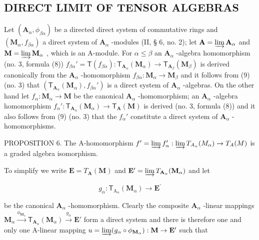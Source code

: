\subsection{DIRECT LIMIT OF TENSOR ALGEBRAS}

Let \((\mathbf{A}_{\alpha},\phi_{\beta \alpha})\) be a directed direct system of commutative rings and \((\mathbf{M}_{\alpha},f_{\beta \alpha})\) a direct system of \(\mathbf{A}_{\alpha}\) -modules (II, § 6, no. 2); let \(\mathbf{A} = \varinjlim \mathbf{A}_{\alpha}\) and \(\mathbf{M} = \varinjlim \mathbf{M}_{\alpha}\) , which is an A-module. For \(\alpha \leqslant \beta\) an \(\mathbf{A}_{\alpha}\) -algebra homomorphism (no. 3, formula (8)) \(f_{\beta \alpha}' = \mathsf{T}(f_{\beta \alpha})\colon \mathsf{T}_{\mathbf{A}_{\alpha}}(\mathbf{M}_{\alpha})\to \mathsf{T}_{\mathbf{A}_{\beta}}(\mathbf{M}_{\beta})\) is derived canonically from the \(\mathbf{A}_{\alpha}\) -homomorphism \(f_{\beta \alpha}\colon \mathbf{M}_{\alpha}\to \mathbf{M}_{\beta}\) and it follows from (9) (no. 3) that \((\mathsf{T}_{\mathbf{A}_{\alpha}}(\mathbf{M}_{\alpha}),f_{\beta \alpha}')\) is a direct system of \(\mathbf{A}_{\alpha}\) -algebras. On the other hand let \(f_{\alpha}\colon \mathbf{M}_{\alpha}\to \mathbf{M}\) be the canonical \(\mathbf{A}_{\alpha}\) -homomorphism; an \(\mathbf{A}_{\alpha}\) -algebra homomorphism \(f_{\alpha}'\colon \mathsf{T}_{\mathbf{A}_{\alpha}}(\mathbf{M}_{\alpha})\to \mathsf{T}_{\mathbf{A}}(\mathbf{M})\) is derived (no. 3, formula (8)) and it also follows from (9) (no. 3) that the \(f_{\alpha}'\) constitute a direct system of \(\mathbf{A}_{\alpha}\) -homomorphisms.

PROPOSITION 6. The A-homomorphism \(f' = \varinjlim f_{\alpha}' : \varinjlim T_{A_{\alpha}}(M_{\alpha}) \to T_{A}(M)\) is a graded algebra isomorphism.

To simplify we write \(\mathbf{E} = T_{\mathbf{A}}(\mathbf{M})\) and \(\mathbf{E}' = \varinjlim T_{\mathbf{A}_{\alpha}}(\mathbf{M}_{\alpha})\) and let

\[
g _ {\alpha}: \mathsf {T} _ {\mathrm{A} _ {\alpha}} (\mathbf {M} _ {\alpha}) \rightarrow \mathbf {E} ^ {\prime}
\]

be the canonical \(\mathbf{A}_{\alpha}\) -homomorphism. Clearly the composite \(\mathbf{A}_{\alpha}\) -linear mappings \(\mathbf{M}_{\alpha} \xrightarrow{\phi_{\mathbf{M}_{\alpha}}} \mathsf{T}_{\mathbf{A}_{\alpha}}(\mathbf{M}_{\alpha}) \xrightarrow{g_{\alpha}} \mathbf{E}'\) form a direct system and there is therefore one and only one A-linear mapping \(u = \varinjlim (g_{\alpha} \circ \phi_{\mathbf{M}_{\alpha}}): \mathbf{M} \to \mathbf{E}'\) such that

